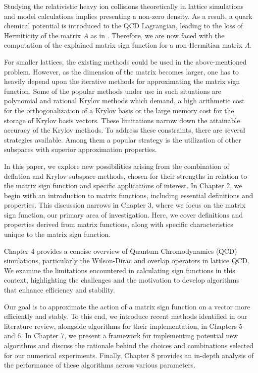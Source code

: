 Studying the relativistic heavy ion collisions theoretically in lattice simulations and model calculations implies presenting a non-zero density. As a result, a quark chemical potential is introduced to the QCD Lagrangian, leading to the loss of Hermiticity of the matrix $A$ as in \cite{16}. Therefore, we are now faced with the computation of the explained matrix sign function for a non-Hermitian matrix $A$.

For smaller lattices, the existing methods could be used in the above-mentioned problem. However, as the dimension of the matrix becomes larger, one has to heavily depend upon the iterative methods for approximating the matrix sign function. Some of the popular methods under use in such situations are polynomial \cite{17,18} and rational \cite{19,20,21} Krylov methods which demand, a high arithmetic cost for the orthogonalization of a Krylov basis or the large memory cost for the storage of Krylov basis vectors. These limitations narrow down the attainable accuracy of the Krylov methods. To address these constraints, there are several strategies available. Among them a popular strategy is the utilization of other subspaces with superior approximation properties.

In this paper, we explore new possibilities arising from the combination of deflation and Krylov subspace methods, chosen for their strengths in relation to the matrix sign function and specific applications of interest. In Chapter 2, we begin with an introduction to matrix functions, including essential definitions and properties. This discussion narrows in Chapter 3, where we focus on the matrix sign function, our primary area of investigation. Here, we cover definitions and properties derived from matrix functions, along with specific characteristics unique to the matrix sign function.

Chapter 4 provides a concise overview of Quantum Chromodynamics (QCD) simulations, particularly the Wilson-Dirac and overlap operators in lattice QCD. We examine the limitations encountered in calculating sign functions in this context, highlighting the challenges and the motivation to develop algorithms that enhance efficiency and stability.

Our goal is to approximate the action of a matrix sign function on a vector more efficiently and stably. To this end, we introduce recent methods identified in our literature review, alongside algorithms for their implementation, in Chapters 5 and 6. In Chapter 7, we present a framework for implementing potential new algorithms and discuss the rationale behind the choices and combinations selected for our numerical experiments. Finally, Chapter 8 provides an in-depth analysis of the performance of these algorithms across various parameters.